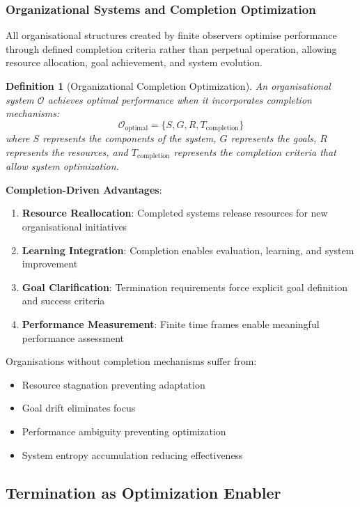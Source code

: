 \documentclass{article}
\newtheorem{definition}[theorem]{Definition}
\begin{document}
\subsubsection{Organizational Systems and Completion Optimization}

All organisational structures created by finite observers optimise performance through defined completion criteria rather than perpetual operation, allowing resource allocation, goal achievement, and system evolution.

\begin{definition}[Organizational Completion Optimization]
An organisational system $\mathcal{O}$ achieves optimal performance when it incorporates completion mechanisms:
\begin{equation}
\mathcal{O}_{\text{optimal}} = \{S, G, R, T_{\text{completion}}\}
\end{equation}
where $S$ represents the components of the system, $G$ represents the goals, $R$ represents the resources, and $T_{\text{completion}}$ represents the completion criteria that allow system optimization.
\end{definition}

\textbf{Completion-Driven Advantages}:

\begin{enumerate}
\item \textbf{Resource Reallocation}: Completed systems release resources for new organisational initiatives
\item \textbf{Learning Integration}: Completion enables evaluation, learning, and system improvement
\item \textbf{Goal Clarification}: Termination requirements force explicit goal definition and success criteria
\item \textbf{Performance Measurement}: Finite time frames enable meaningful performance assessment
\end{enumerate}

Organisations without completion mechanisms suffer from:
\begin{itemize}
\item Resource stagnation preventing adaptation
\item Goal drift eliminates focus
\item Performance ambiguity preventing optimization
\item System entropy accumulation reducing effectiveness
\end{itemize}

\subsection{Termination as Optimization Enabler}
\end{document}
